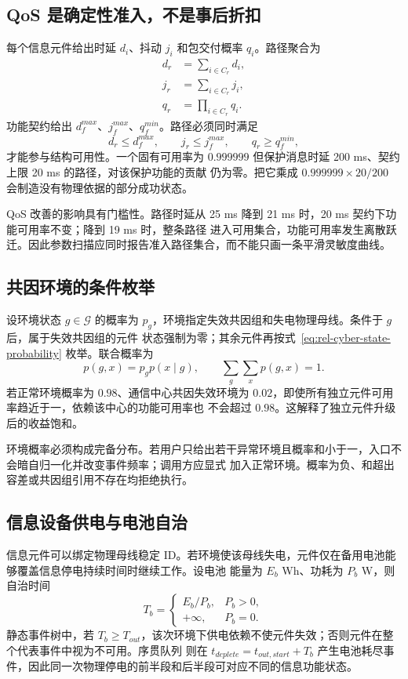 \subsection{QoS 是确定性准入，不是事后折扣}
每个信息元件给出时延 $d_i$、抖动 $j_i$ 和包交付概率 $q_i$。路径聚合为
\begin{align}
 d_r&=\sum_{i\in C_r}d_i,\\
 j_r&=\sum_{i\in C_r}j_i,\\
 q_r&=\prod_{i\in C_r}q_i.
\end{align}
功能契约给出 $d_f^{max}$、$j_f^{max}$、$q_f^{min}$。路径必须同时满足
\begin{equation}
 d_r\le d_f^{max},\qquad j_r\le j_f^{max},\qquad q_r\ge q_f^{min},
\end{equation}
才能参与结构可用性。一个固有可用率为 $0.999999$ 但保护消息时延 200 ms、契约上限 20 ms 的路径，对该保护功能的贡献
仍为零。把它乘成 $0.999999\times20/200$ 会制造没有物理依据的部分成功状态。

QoS 改善的影响具有门槛性。路径时延从 25 ms 降到 21 ms 时，20 ms 契约下功能可用率不变；降到 19 ms 时，整条路径
进入可用集合，功能可用率发生离散跃迁。因此参数扫描应同时报告准入路径集合，而不能只画一条平滑灵敏度曲线。

\subsection{共因环境的条件枚举}
设环境状态 $g\in\mathcal G$ 的概率为 $p_g$，环境指定失效共因组和失电物理母线。条件于 $g$ 后，属于失效共因组的元件
状态强制为零；其余元件再按式~\eqref{eq:rel-cyber-state-probability} 枚举。联合概率为
\begin{equation}
 p(g,x)=p_g p(x\mid g),\qquad
 \sum_g\sum_xp(g,x)=1.
\end{equation}
若正常环境概率为 $0.98$、通信中心共因失效环境为 $0.02$，即使所有独立元件可用率趋近于一，依赖该中心的功能可用率也
不会超过 $0.98$。这解释了独立元件升级后的收益饱和。

环境概率必须构成完备分布。若用户只给出若干异常环境且概率和小于一，入口不会暗自归一化并改变事件频率；调用方应显式
加入正常环境。概率为负、和超出容差或共因组引用不存在均拒绝执行。

\subsection{信息设备供电与电池自治}
信息元件可以绑定物理母线稳定 ID。若环境使该母线失电，元件仅在备用电池能够覆盖信息停电持续时间时继续工作。设电池
能量为 $E_b$ Wh、功耗为 $P_b$ W，则自治时间
\begin{equation}
 T_b=\begin{cases}E_b/P_b,&P_b>0,\\+\infty,&P_b=0.\end{cases}
\end{equation}
静态事件树中，若 $T_b\ge T_{out}$，该次环境下供电依赖不使元件失效；否则元件在整个代表事件中视为不可用。序贯队列
则在 $t_{deplete}=t_{out,start}+T_b$ 产生电池耗尽事件，因此同一次物理停电的前半段和后半段可对应不同的信息功能状态。

